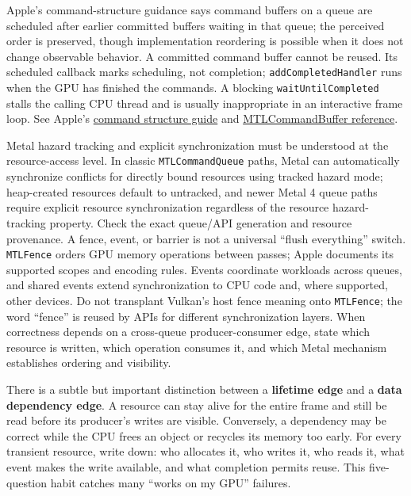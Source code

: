 Apple's command-structure guidance says command buffers on a queue are scheduled after earlier committed buffers waiting in that queue; the perceived order is preserved, though implementation reordering is possible when it does not change observable behavior. A committed command buffer cannot be reused. Its scheduled callback marks scheduling, not completion; \texttt{addCompletedHandler} runs when the GPU has finished the commands. A blocking \texttt{waitUntilCompleted} stalls the calling CPU thread and is usually inappropriate in an interactive frame loop. See Apple's \href{https://developer.apple.com/documentation/Metal/setting-up-a-command-structure}{command structure guide} and \href{https://developer.apple.com/documentation/metal/mtlcommandbuffer}{MTLCommandBuffer reference}.

Metal hazard tracking and explicit synchronization must be understood at the resource-access level. In classic \texttt{MTLCommandQueue} paths, Metal can automatically synchronize conflicts for directly bound resources using tracked hazard mode; heap-created resources default to untracked, and newer Metal 4 queue paths require explicit resource synchronization regardless of the resource hazard-tracking property. Check the exact queue/API generation and resource provenance. A fence, event, or barrier is not a universal ``flush everything'' switch. \texttt{MTLFence} orders GPU memory operations between passes; Apple documents its supported scopes and encoding rules. Events coordinate workloads across queues, and shared events extend synchronization to CPU code and, where supported, other devices. Do not transplant Vulkan's host fence meaning onto \texttt{MTLFence}; the word ``fence'' is reused by APIs for different synchronization layers. When correctness depends on a cross-queue producer-consumer edge, state which resource is written, which operation consumes it, and which Metal mechanism establishes ordering and visibility.

There is a subtle but important distinction between a \textbf{lifetime edge} and a \textbf{data dependency edge}. A resource can stay alive for the entire frame and still be read before its producer's writes are visible. Conversely, a dependency may be correct while the CPU frees an object or recycles its memory too early. For every transient resource, write down: who allocates it, who writes it, who reads it, what event makes the write available, and what completion permits reuse. This five-question habit catches many ``works on my GPU'' failures.

